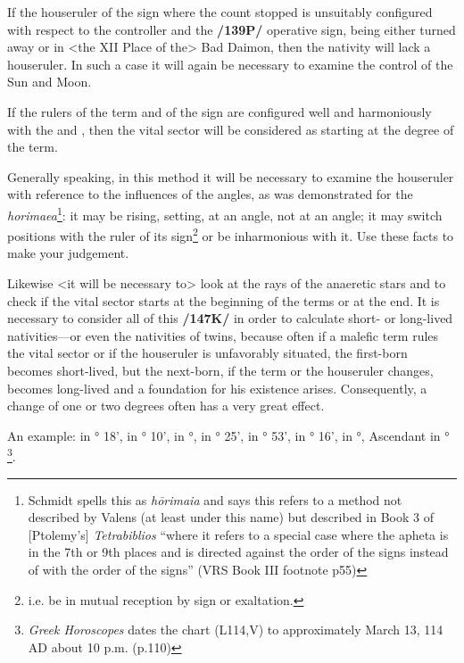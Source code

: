 If the houseruler of the sign where the count stopped is unsuitably configured with respect to the controller and
the \textbf{/139P/} operative sign, being either turned away or in <the XII Place of the> Bad Daimon, then the nativity will lack a houseruler. In such a case it will again be necessary to examine the control of the Sun and Moon. 

If the rulers of the term and of the sign are configured well and harmoniously with the \Sun\xspace and \Moon, then the vital sector will be considered as starting at the degree of the term.

Generally speaking, in this method it will be necessary to examine the houseruler with reference to the influences of the angles, as was demonstrated for the \textsl{horimaea}\footnote{Schmidt spells this as \textsl{h\=orimaia} and says this refers to a method not described by Valens (at least under this name) but described in Book 3 of [Ptolemy's] \textsl{Tetrabiblios} ``where it refers to a special case where the apheta is in the 7th or 9th places and is directed against the order of the signs instead of with the order of the signs'' (VRS Book III footnote p55)}: it may be rising, setting, at an angle, not at an angle; it may switch positions with the ruler of its sign\footnote{i.e. be in mutual reception by sign or exaltation.} or be inharmonious with it. Use these facts to make your judgement. 

Likewise <it will be necessary to> look at the rays of the anaeretic stars and to check if the vital sector starts at the beginning of the terms or at the end. It is necessary to consider all of this \textbf{/147K/} in order to calculate short- or long-lived nativities—or even the nativities of twins, because often if a malefic term rules the vital sector or if the houseruler is unfavorably situated, the first-born
becomes short-lived, but the next-born, if the term or the houseruler changes, becomes long-lived and a foundation for his existence arises. Consequently, a change of one or two degrees often has a very great effect.

An example: \Sun\xspace in \Taurus\xspace 25° 18', \Moon\xspace in \Aquarius\xspace 7° 10', \Saturn\xspace in \Aries\xspace 24°, \Jupiter\xspace in \Taurus\xspace 4° 25', \Mars\xspace in \Cancer\xspace 22° 53', \Venus\xspace in \Gemini\xspace 28° 16', \Mercury\xspace in \Gemini\xspace 6°, Ascendant in \Capricorn\xspace 27°
\footnote{\textit{Greek Horoscopes} dates the chart (L114,V) to approximately March 13, 114 AD about 10 p.m. (p.110)}. 

